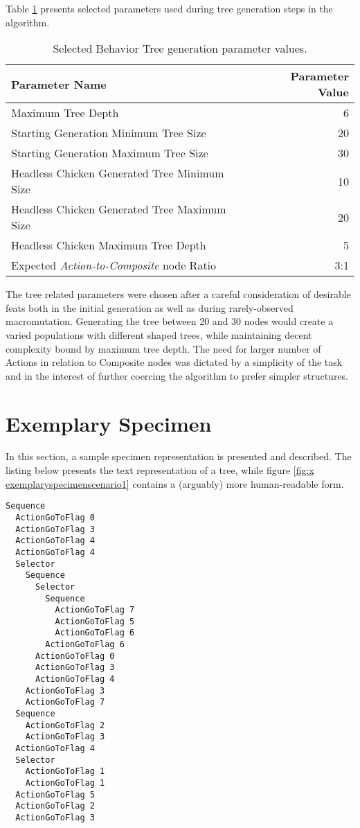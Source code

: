 Table \ref{table:x selectedbtparameters} presents selected parameters used during tree generation steps in the algorithm.
\begin{table} [h]
    \centering
    \begin{tabular} {l r}
        \hline \hline
        Parameter Name & Parameter Value \\
        \hline
        Maximum Tree Depth & 6 \\
        Starting Generation Minimum Tree Size & 20 \\
        Starting Generation Maximum Tree Size & 30 \\
        Headless Chicken Generated Tree Minimum Size & 10 \\
        Headless Chicken Generated Tree Maximum Size & 20 \\
        Headless Chicken Maximum Tree Depth & 5 \\
        Expected \textit{Action-to-Composite} node Ratio & 3:1 \\
    \end{tabular}
    \caption{Selected Behavior Tree generation parameter values.}
    \label{table:x selectedbtparameters}
\end{table}
The tree related parameters were chosen after a careful consideration of desirable feats both in the initial generation as well as during rarely-observed macromutation. Generating the tree between 20 and 30 nodes would create a varied populations with different shaped trees, while maintaining decent complexity bound by maximum tree depth. The need for larger number of Actions in relation to Composite nodes was dictated by a simplicity of the task and in the interest of further coercing the algorithm to prefer simpler structures.
\newpage
\section{Exemplary Specimen}
In this section, a sample specimen representation is presented and described. The listing below presents the text representation of a tree, while figure \ref{fig:x exemplaryspecimenscenario1} contains a (arguably) more human-readable form.
\begin{lstlisting}
Sequence
  ActionGoToFlag 0
  ActionGoToFlag 3
  ActionGoToFlag 4
  ActionGoToFlag 4
  Selector
    Sequence
      Selector
        Sequence
          ActionGoToFlag 7
          ActionGoToFlag 5
          ActionGoToFlag 6
        ActionGoToFlag 6
      ActionGoToFlag 0
      ActionGoToFlag 3
      ActionGoToFlag 4
    ActionGoToFlag 3
    ActionGoToFlag 7
  Sequence
    ActionGoToFlag 2
    ActionGoToFlag 3
  ActionGoToFlag 4
  Selector
    ActionGoToFlag 1
    ActionGoToFlag 1
  ActionGoToFlag 5
  ActionGoToFlag 2
  ActionGoToFlag 3
\end{lstlisting}

